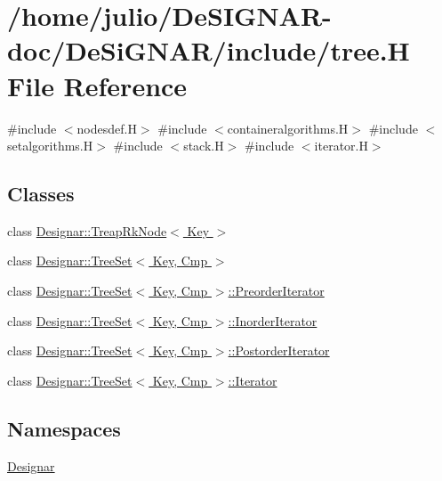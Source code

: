 \hypertarget{tree_8_h}{}\section{/home/julio/\+De\+S\+I\+G\+N\+A\+R-\/doc/\+De\+Si\+G\+N\+A\+R/include/tree.H File Reference}
\label{tree_8_h}
{\ttfamily \#include $<$nodesdef.\+H$>$}\newline
{\ttfamily \#include $<$containeralgorithms.\+H$>$}\newline
{\ttfamily \#include $<$setalgorithms.\+H$>$}\newline
{\ttfamily \#include $<$stack.\+H$>$}\newline
{\ttfamily \#include $<$iterator.\+H$>$}\newline
\subsection*{Classes}
\begin{DoxyCompactItemize}
\item 
class \hyperlink{class_designar_1_1_treap_rk_node}{Designar\+::\+Treap\+Rk\+Node$<$ Key $>$}
\item 
class \hyperlink{class_designar_1_1_tree_set}{Designar\+::\+Tree\+Set$<$ Key, Cmp $>$}
\item 
class \hyperlink{class_designar_1_1_tree_set_1_1_preorder_iterator}{Designar\+::\+Tree\+Set$<$ Key, Cmp $>$\+::\+Preorder\+Iterator}
\item 
class \hyperlink{class_designar_1_1_tree_set_1_1_inorder_iterator}{Designar\+::\+Tree\+Set$<$ Key, Cmp $>$\+::\+Inorder\+Iterator}
\item 
class \hyperlink{class_designar_1_1_tree_set_1_1_postorder_iterator}{Designar\+::\+Tree\+Set$<$ Key, Cmp $>$\+::\+Postorder\+Iterator}
\item 
class \hyperlink{class_designar_1_1_tree_set_1_1_iterator}{Designar\+::\+Tree\+Set$<$ Key, Cmp $>$\+::\+Iterator}
\end{DoxyCompactItemize}
\subsection*{Namespaces}
\begin{DoxyCompactItemize}
\item 
 \hyperlink{namespace_designar}{Designar}
\end{DoxyCompactItemize}
